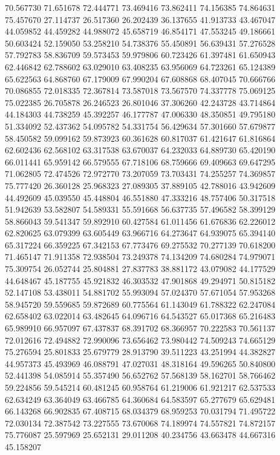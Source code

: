 70.567730
71.651678
72.444771
73.469416
73.862411
74.156385
74.864631
75.457670
27.114737
26.517360
26.202439
36.137655
41.913733
43.467047
44.059852
44.459282
44.988072
45.658719
46.854171
47.553245
49.186661
50.603424
52.159050
53.258210
54.738376
55.450891
56.639431
57.276528
57.792783
58.836709
59.573453
59.979806
60.723426
61.397481
61.650943
62.446842
62.788602
63.029010
63.408235
63.956069
64.723261
65.124389
65.622563
64.868760
67.179009
67.990204
67.608868
68.407045
70.666766
70.086855
72.018335
72.367814
73.587018
73.567570
74.337778
75.069125
75.022385
26.705878
26.246523
26.801046
37.306260
42.243728
43.714864
44.184303
44.738259
45.392257
46.177787
47.006330
48.350851
49.795180
51.334092
52.437362
54.095782
54.331754
56.429634
57.301660
57.679877
58.450582
59.099162
59.873923
60.361628
60.817037
61.421647
61.816864
62.602436
62.568102
63.317538
63.670037
64.232033
64.889730
65.420190
66.011441
65.959142
66.579555
67.718106
68.759666
69.409663
69.647295
71.062805
72.474526
72.972770
73.207059
73.703431
74.255257
74.369857
75.777420
26.360128
25.968323
27.089305
37.889105
42.788016
43.942609
44.492609
45.039550
45.448804
46.551880
47.333216
48.757406
50.317518
51.942639
53.582807
54.589331
55.591668
56.637735
57.496582
58.399129
58.866043
59.541347
59.892910
60.427584
61.011456
61.676836
62.226012
62.820625
63.079399
63.605449
63.966716
64.273647
64.939075
65.394140
65.317224
66.359225
67.342153
67.773476
69.275532
70.277139
70.618200
71.465147
71.911358
72.938504
73.249378
74.134209
74.680284
74.979071
75.309754
26.052744
25.804881
27.837783
38.881172
43.079082
44.177529
44.648467
45.187755
45.921832
46.303532
47.901868
49.294971
50.815182
52.147108
53.438011
54.881702
55.993094
57.024370
57.671054
57.953268
58.945720
59.559685
59.872689
60.775564
61.143049
61.788322
62.247084
62.658402
63.022014
63.482645
64.096716
64.543527
65.017368
65.216483
65.989910
66.957097
67.437837
68.391702
68.366957
70.222583
70.561137
72.012616
72.494882
72.990096
73.656462
73.980442
74.509243
74.665129
75.276594
25.801833
25.679779
28.913790
39.511223
43.251994
44.382827
44.957373
45.493969
46.088791
47.027031
48.318164
49.596265
50.840800
52.441398
54.085914
55.357490
56.652762
57.568139
58.162701
58.766462
59.224856
59.545214
60.481245
60.958764
61.219006
61.921217
62.537533
62.634249
63.364049
63.466785
64.360684
64.583597
65.277679
65.629481
66.143268
66.902835
67.408715
68.034379
68.959253
70.031794
71.495722
72.030134
72.387542
73.227555
73.670068
74.189974
74.557821
74.872157
75.776087
25.597969
25.652131
29.011208
40.234756
43.663478
44.667316
45.158207
